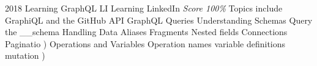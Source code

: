 \documentclass[11pt,a4paper]{moderncv}
\begin{document}
\cventry
    {2018}
    {Learning GraphQL}
    {LI Learning}
    {LinkedIn}
    {\textit{Score 100\%}}
    {
        Topics include                                                                                            %
            GraphiQL and the GitHub API                                                                           %
            GraphQL Queries                                                                                       %
            Understanding Schemas                                                                                 %
            Query the \_\_schema                                                                                  %
            Handling Data                                                                                         %
                Aliases                                                                                           %
                Fragments                                                                                         %
                Nested fields                                                                                     %
                Connections                                                                                       %
                Paginatio                                                                                         %
            )                                                                                                     %
            Operations and Variables                                                                              %
                Operation names                                                                                   %
                variable definitions                                                                              %
                mutation                                                                                          %
            )                                                                                                     %
    }
\end{document}
